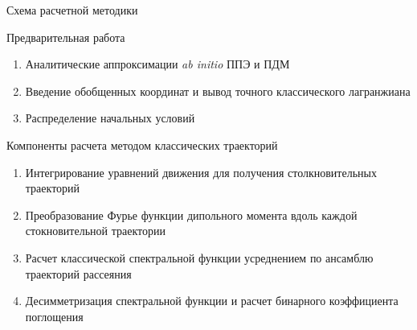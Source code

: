 \documentclass[10pt,usenames,pdf,hyperref={unicode},dvipsnames]{beamer}
\begin{document}
\begin{frame}{Схема расчетной методики}
    \vspace*{-0.5cm}
    \begin{block}{Предварительная работа}
        \begin{enumerate}
            \item Аналитические аппроксимации \textit{ab initio} ППЭ и ПДМ
            \item Введение обобщенных координат и вывод точного классического лагранжиана
            \item Распределение начальных условий
        \end{enumerate}
    \end{block}
    \vspace*{-0.3cm}
    \begin{block}{Компоненты расчета методом классических траекторий}
        \begin{enumerate}
        \item Интегрирование уравнений движения для получения столкновительных траекторий
        \item Преобразование Фурье функции дипольного момента вдоль каждой стокновительной траектории
        \item Расчет классической спектральной функции усреднением по ансамблю траекторий рассеяния 
        \item Десимметризация спектральной функции и расчет бинарного коэффициента поглощения
        \end{enumerate}
    \end{block}
\end{frame}
\end{document}
